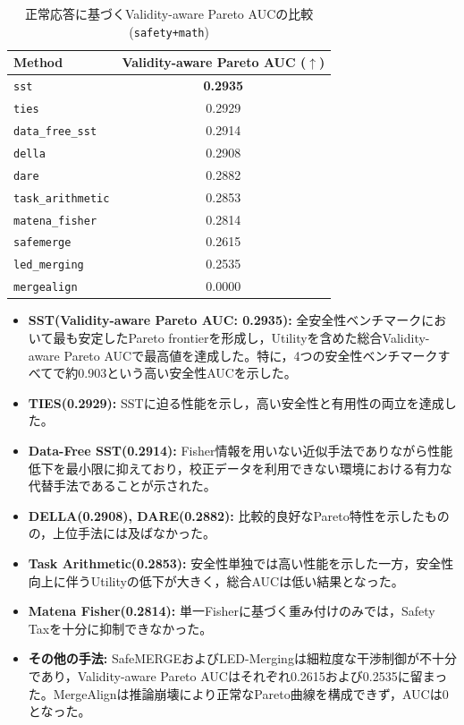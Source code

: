 \begin{table}[H]
\centering
\caption{正常応答に基づくValidity-aware Pareto AUCの比較(\texttt{safety+math})}
\label{tab:pareto_auc}
\small
\begin{tabular}{lc}
\toprule
\textbf{Method} & \textbf{Validity-aware Pareto AUC ($\uparrow$)} \\
\midrule
\texttt{sst} & \textbf{0.2935} \\
\texttt{ties} & 0.2929 \\
\texttt{data\_free\_sst} & 0.2914 \\
\texttt{della} & 0.2908 \\
\texttt{dare} & 0.2882 \\
\texttt{task\_arithmetic} & 0.2853 \\
\texttt{matena\_fisher} & 0.2814 \\
\texttt{safemerge} & 0.2615 \\
\texttt{led\_merging} & 0.2535 \\
\texttt{mergealign} & 0.0000 \\
\bottomrule
\end{tabular}
\end{table}

\begin{itemize}
    \item \textbf{SST(Validity-aware Pareto AUC: 0.2935):}
    全安全性ベンチマークにおいて最も安定したPareto frontierを形成し，Utilityを含めた総合Validity-aware Pareto AUCで最高値を達成した。特に，4つの安全性ベンチマークすべてで約0.903という高い安全性AUCを示した。
    \item \textbf{TIES(0.2929):}
    SSTに迫る性能を示し，高い安全性と有用性の両立を達成した。
    \item \textbf{Data-Free SST(0.2914):}
    Fisher情報を用いない近似手法でありながら性能低下を最小限に抑えており，校正データを利用できない環境における有力な代替手法であることが示された。
    \item \textbf{DELLA(0.2908), DARE(0.2882):}
    比較的良好なPareto特性を示したものの，上位手法には及ばなかった。
    \item \textbf{Task Arithmetic(0.2853):}
    安全性単独では高い性能を示した一方，安全性向上に伴うUtilityの低下が大きく，総合AUCは低い結果となった。
    \item \textbf{Matena Fisher(0.2814):}
    単一Fisherに基づく重み付けのみでは，Safety Taxを十分に抑制できなかった。
    \item \textbf{その他の手法:}
    SafeMERGEおよびLED-Mergingは細粒度な干渉制御が不十分であり，Validity-aware Pareto AUCはそれぞれ0.2615および0.2535に留まった。MergeAlignは推論崩壊により正常なPareto曲線を構成できず，AUCは0となった。
\end{itemize}

